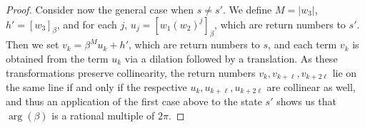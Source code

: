 \documentclass[10pt,a4paper]{amsart}
\begin{document}
\begin{proof}
    Consider now the general case when $s\neq s'$.   We define $M=\lvert w_3\rvert$, $h' = [w_3]_\beta$, and for each $j$, $u_j=[w_1(w_2)^j]_\beta$, which are return numbers to $s'$.
    Then we set    $v_k=\beta^M u_k+h'$, which are return numbers to $s$, and  each term $v_k$ is obtained from the term $u_k$ via a dilation followed by a translation. As these transformations preserve collinearity, the  return numbers $v_k, v_{k+\ell}, v_{k+2\ell}$ lie on the same line if and only if the respective  $u_k, u_{k+\ell}, u_{k+2\ell}$ are collinear as well, and thus an application of the first case above to the state $s'$ shows us that $\arg(\beta)$ is a rational multiple of $2\pi$. 
\end{proof}
\end{document}
